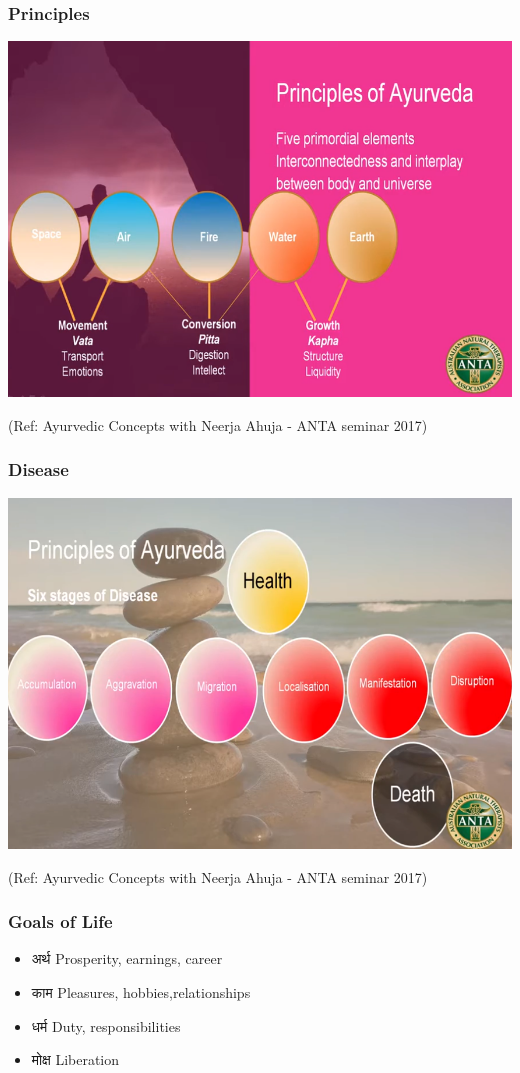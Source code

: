 \begin{frame}[fragile]\frametitle{Principles}

\begin{center}
\includegraphics[width=0.7\linewidth,keepaspectratio]{images/ayur1}
\end{center}

{\tiny (Ref: Ayurvedic Concepts with Neerja Ahuja - ANTA seminar 2017)}

\end{frame}

\begin{frame}[fragile]\frametitle{Disease}

\begin{center}
\includegraphics[width=0.7\linewidth,keepaspectratio]{images/ayur2}
\end{center}

{\tiny (Ref: Ayurvedic Concepts with Neerja Ahuja - ANTA seminar 2017)}

\end{frame}

\begin{frame}[fragile]\frametitle{Goals of Life}

	\begin{itemize}
	\item  अर्थ Prosperity, earnings, career
	\item  काम Pleasures, hobbies,relationships
	\item  धर्म Duty, responsibilities
	\item  मोक्ष Liberation
	\end{itemize}

\end{frame}


